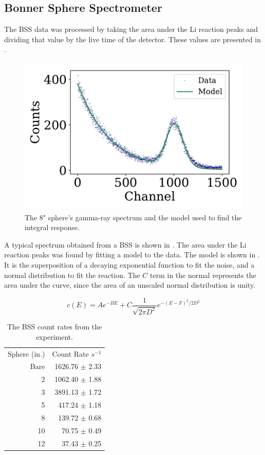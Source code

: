 \clearpage

\subsection{Bonner Sphere Spectrometer}

The BSS data was processed by taking the area under the Li reaction peaks and dividing that value by the live time of the detector.
These values are presented in .

\begin{figure}[htb]
\centering
\includegraphics[height=3in]{tex/figures/bs4_spectrum.pdf}
\caption[8" BSS Spectrum]{The 8" sphere's gamma-ray spectrum and the model used to find the integral response.}
\label{fig:bs4_spectrum}
\end{figure}

A typical spectrum obtained from a BSS is shown in .
The area under the Li reaction peaks was found by fitting a model to the data.
The model is shown in .
It is the superposition of a decaying exponential function to fit the noise, and a normal distribution to fit the reaction.
The $C$ term in the normal represents the area under the curve, since the area of an unscaled normal distribution is unity.

\begin{equation}
\label{eqn:model}
c(E) = A e^{-BE} + C \frac{1}{\sqrt{2 \pi D^2}} e^{-(E - F)^2 / 2 D^2}
\end{equation}


\begin{table}[h]\centering
\label{tab:bss}
\caption{The BSS count rates from the experiment.}
\begin{tabular}{ r | r }
\toprule
Sphere (in.)  & Count Rate $s^{-1}$\\
Bare & 1626.76 $\pm$ 2.33\\
2  & 1062.40 $\pm$ 1.88\\
3 & 3891.13 $\pm$ 1.72\\
5 & 417.24 $\pm$ 1.18\\
8 & 139.72 $\pm$ 0.68\\
10 & 70.75 $\pm$ 0.49\\
12 & 37.43 $\pm$ 0.25\\
\end{tabular}
\end{table}


